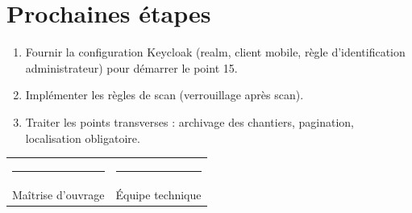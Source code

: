 \documentclass[11pt,a4paper]{article}
\begin{document}
\section{Prochaines étapes}
\begin{enumerate}[leftmargin=*, itemsep=1pt]
  \item Fournir la configuration Keycloak (realm, client mobile, règle d'identification administrateur) pour démarrer le point 15.
  \item Implémenter les règles de scan (verrouillage après scan).
  \item Traiter les points transverses : archivage des chantiers, pagination, localisation obligatoire.
\end{enumerate}

\vspace{1.2em}
\noindent
\begin{tabular}{@{}p{8cm} p{8cm}@{}}
  \rule{6cm}{0.4pt} & \rule{6cm}{0.4pt} \\
  \small Maîtrise d'ouvrage & \small Équipe technique \\
\end{tabular}
\end{document}
